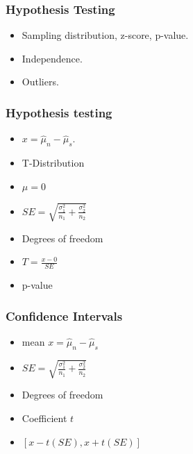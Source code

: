 \documentclass{beamer}
\begin{document}
\begin{frame}
  \frametitle{Hypothesis Testing}
  \begin{itemize}
    \item[] 
      Sampling distribution, z-score, p-value. 
      \vspace{0.5cm}
    \item[] 
      Independence.
      \vspace{0.5cm}
    \item[] 
      Outliers.
  \end{itemize}
\end{frame}

\begin{frame}
  \frametitle{Hypothesis testing}
  \begin{itemize}
    \item[] 
      $x = \hat{\mu}_n - \hat{\mu}_s$. 
      \vspace{0.2cm}
    \item[] 
      T-Distribution
      \vspace{0.2cm}
    \item[] 
      $\mu = 0$
      \vspace{0.2cm}
    \item[] 
      $SE = \sqrt{ \frac{\sigma_1^2}{n_1} + \frac{\sigma_2^2}{n_2} }$
      \vspace{0.2cm}
    \item[] 
      Degrees of freedom
      \vspace{0.2cm}
    \item[] 
      $T = \frac{x - 0}{SE}$
      \vspace{0.2cm}
    \item[] 
      p-value
  \end{itemize}
\end{frame}

\begin{frame}
  \frametitle{Confidence Intervals}
  \begin{itemize}
    \item[] 
      mean $x = \hat{\mu}_n - \hat{\mu}_s$
      \vspace{0.5cm}
    \item[] 
      $SE = \sqrt{ \frac{\sigma_1^2}{n_1} + \frac{\sigma_2^2}{n_2} }$
      \vspace{0.5cm}
    \item[] 
      Degrees of freedom
      \vspace{0.5cm}
    \item[] 
      Coefficient $t$
      \vspace{0.5cm}
    \item[] 
      $[x - t(SE), x + t(SE)]$
  \end{itemize}
\end{frame}
\end{document}
